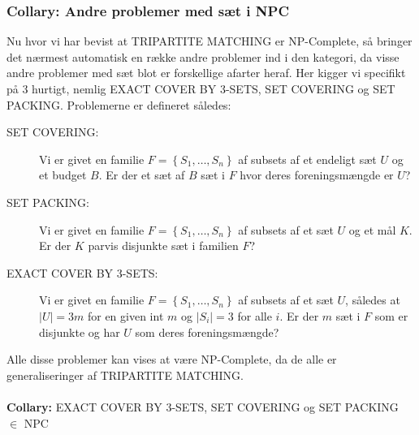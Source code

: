 \subsubsection{Collary: Andre problemer med sæt i NPC}

Nu hvor vi har bevist at TRIPARTITE MATCHING er NP-Complete, så bringer det
nærmest automatisk en række andre problemer ind i den kategori, da visse andre
problemer med sæt blot er forskellige afarter heraf. Her kigger vi specifikt på
3 hurtigt, nemlig EXACT COVER BY 3-SETS, SET COVERING og SET PACKING.
Problemerne er defineret således:

\begin{description}
 \item[SET COVERING:] Vi er givet en familie $F = \left\lbrace S_1,\hdots,S_n
	 \right\rbrace$ af subsets af et endeligt sæt $U$ og et budget $B$. Er der
	 et sæt af $B$ sæt i $F$ hvor deres foreningsmængde er $U$?
 \item[SET PACKING:] Vi er givet en familie $F = \left\lbrace S_1,\hdots,S_n
	 \right\rbrace$ af subsets af et sæt $U$ og et mål $K$. Er der $K$ parvis
	 disjunkte sæt i familien $F$?
 \item[EXACT COVER BY 3-SETS:] Vi er givet en familie $F = \left\lbrace
	 S_1,\hdots,S_n \right\rbrace$ af subsets af et sæt $U$, således at
	 $|U|=3m$ for en given int $m$ og $|S_i|=3$ for alle $i$. Er der $m$ sæt i
	 $F$ som er disjunkte og har $U$ som deres foreningsmængde?
\end{description}

Alle disse problemer kan vises at være NP-Complete, da de alle er
generaliseringer af TRIPARTITE MATCHING.\\
~\\
\textbf{Collary:} EXACT COVER BY 3-SETS, SET COVERING og SET PACKING $\in$ NPC

